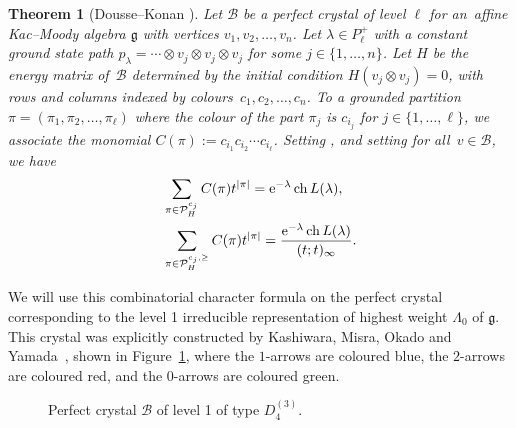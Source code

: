 \documentclass[pdftex]{sigma}
\numberwithin{equation}{section}
\newtheorem{Theorem}{Theorem}[section]
\theoremstyle{definition}
\begin{document}
\begin{Theorem}[{Dousse--Konan \cite[Theorem~1.9]{DK19b}}]\label{thm:KMN2coloured}
Let $\mathcal{B}$ be a perfect crystal of level $\ell$ for an~affine Kac--Moody algebra $\mathfrak{g}$ with vertices $v_1,v_2,\ldots,v_n$. Let $\lambda \in P^+_\ell$ with a constant ground state path $p_\lambda = \cdots \otimes v_j \otimes v_j \otimes v_j$ for some $j\in\{1,\ldots,n\}$. Let $H$ be the energy matrix of~$\mathcal{B}$ determined by the initial condition $H(v_j\otimes v_j)=0$, with rows and columns indexed by colours~${c_1,c_2,\ldots,c_n}$. To a grounded partition $\pi=(\pi_1,\pi_2,\ldots,\pi_\ell)$ where the colour of the part $\pi_j$ is $c_{i_j}$ for $j\in\{1,\ldots,\ell\}$, we associate the monomial $C(\pi):= c_{i_1}c_{i_2} \cdots  c_{i_\ell}$.
Setting , and setting  for all~${v \in \mathcal{B}}$, we have
\begin{align}
&\sum_{\pi \in \mathcal{P}_{H}^{c_j}} C(\pi) t^{|\pi|}= {\rm e}^{-\lambda} \operatorname{ch}L(\lambda),\label{eq:grounded_char}\\
&\sum_{\pi \in \mathcal{P}_{H}^{c_j,\geq}} C(\pi) t^{|\pi|}= \frac{{\rm e}^{-\lambda} \operatorname{ch}L(\lambda)}{(t;t)_\infty}\label{eq:geq_grounded_char}.
\end{align}
\end{Theorem}

We will use this combinatorial character formula on the perfect crystal corresponding to the level 1 irreducible representation of highest weight $\Lambda_0$ of $\mathfrak{g}$. This crystal was explicitly constructed by Kashiwara, Misra, Okado and Yamada~\cite{KMOY07}, shown in Figure~\ref{fig:G2perfectcrystal}, where the $1$\nobreakdash-arrows are coloured blue, the $2$-arrows are coloured red, and the $0$-arrows are coloured green.

\begin{figure}[!t]
 \centering
 \caption{Perfect crystal $\mathcal{B}$ of level 1 of type $D_4^{(3)}$.} \label{fig:G2perfectcrystal}
\end{figure}
\end{document}
